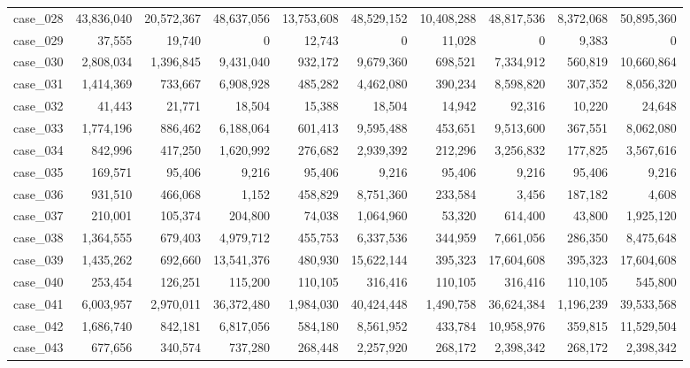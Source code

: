 \begin{footnotesize}
\begin{longtable}{l r rr rr rr rr}
case\_028 & 43{,}836{,}040 & 20{,}572{,}367 & 48{,}637{,}056 & 13{,}753{,}608 & 48{,}529{,}152 & 10{,}408{,}288 & 48{,}817{,}536 & 8{,}372{,}068 & 50{,}895{,}360 \\
case\_029 & 37{,}555 & 19{,}740 & 0 & 12{,}743 & 0 & 11{,}028 & 0 & 9{,}383 & 0 \\
case\_030 & 2{,}808{,}034 & 1{,}396{,}845 & 9{,}431{,}040 & 932{,}172 & 9{,}679{,}360 & 698{,}521 & 7{,}334{,}912 & 560{,}819 & 10{,}660{,}864 \\
case\_031 & 1{,}414{,}369 & 733{,}667 & 6{,}908{,}928 & 485{,}282 & 4{,}462{,}080 & 390{,}234 & 8{,}598{,}820 & 307{,}352 & 8{,}056{,}320 \\
case\_032 & 41{,}443 & 21{,}771 & 18{,}504 & 15{,}388 & 18{,}504 & 14{,}942 & 92{,}316 & 10{,}220 & 24{,}648 \\
case\_033 & 1{,}774{,}196 & 886{,}462 & 6{,}188{,}064 & 601{,}413 & 9{,}595{,}488 & 453{,}651 & 9{,}513{,}600 & 367{,}551 & 8{,}062{,}080 \\
case\_034 & 842{,}996 & 417{,}250 & 1{,}620{,}992 & 276{,}682 & 2{,}939{,}392 & 212{,}296 & 3{,}256{,}832 & 177{,}825 & 3{,}567{,}616 \\
case\_035 & 169{,}571 & 95{,}406 & 9{,}216 & 95{,}406 & 9{,}216 & 95{,}406 & 9{,}216 & 95{,}406 & 9{,}216 \\
case\_036 & 931{,}510 & 466{,}068 & 1{,}152 & 458{,}829 & 8{,}751{,}360 & 233{,}584 & 3{,}456 & 187{,}182 & 4{,}608 \\
case\_037 & 210{,}001 & 105{,}374 & 204{,}800 & 74{,}038 & 1{,}064{,}960 & 53{,}320 & 614{,}400 & 43{,}800 & 1{,}925{,}120 \\
case\_038 & 1{,}364{,}555 & 679{,}403 & 4{,}979{,}712 & 455{,}753 & 6{,}337{,}536 & 344{,}959 & 7{,}661{,}056 & 286{,}350 & 8{,}475{,}648 \\
case\_039 & 1{,}435{,}262 & 692{,}660 & 13{,}541{,}376 & 480{,}930 & 15{,}622{,}144 & 395{,}323 & 17{,}604{,}608 & 395{,}323 & 17{,}604{,}608 \\
case\_040 & 253{,}454 & 126{,}251 & 115{,}200 & 110{,}105 & 316{,}416 & 110{,}105 & 316{,}416 & 110{,}105 & 545{,}800 \\
case\_041 & 6{,}003{,}957 & 2{,}970{,}011 & 36{,}372{,}480 & 1{,}984{,}030 & 40{,}424{,}448 & 1{,}490{,}758 & 36{,}624{,}384 & 1{,}196{,}239 & 39{,}533{,}568 \\
case\_042 & 1{,}686{,}740 & 842{,}181 & 6{,}817{,}056 & 584{,}180 & 8{,}561{,}952 & 433{,}784 & 10{,}958{,}976 & 359{,}815 & 11{,}529{,}504 \\
case\_043 & 677{,}656 & 340{,}574 & 737{,}280 & 268{,}448 & 2{,}257{,}920 & 268{,}172 & 2{,}398{,}342 & 268{,}172 & 2{,}398{,}342 \\

\end{longtable}
\end{footnotesize}

